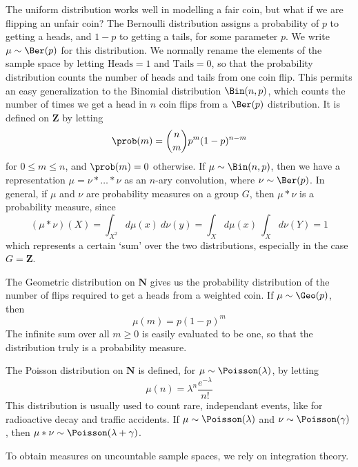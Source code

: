 \begin{example}
    The uniform distribution works well in modelling a fair coin, but what if we are flipping an unfair coin? The Bernoulli distribution assigns a probability of $p$ to getting a heads, and $1-p$ to getting a tails, for some parameter $p$. We write $\mu \sim \Ber(p)$ for this distribution. We normally rename the elements of the sample space by letting $\text{Heads} = 1$ and $\text{Tails} = 0$, so that the probability distribution counts the number of heads and tails from one coin flip. This permits an easy generalization to the Binomial distribution $\Bin(n,p)$, which counts the number of times we get a head in $n$ coin flips from a $\Ber(p)$ distribution. It is defined on $\mathbf{Z}$ by letting
    \[ \prob(m) = \binom{n}{m} p^m (1-p)^{n-m} \]
    for $0 \leq m \leq n$, and $\prob(m) = 0$ otherwise. If $\mu \sim \Bin(n,p)$, then we have a representation $\mu = \nu * \dots * \nu$ as an $n$-ary convolution, where $\nu \sim \Ber(p)$. In general, if $\mu$ and $\nu$ are probability measures on a group $G$, then $\mu * \nu$ is a probability measure, since
    \[ (\mu * \nu)(X) = \int_{X^2} d\mu(x)\ d\nu(y) = \int_X d\mu(x) \ \int_X d\nu(Y) = 1 \]
    which represents a certain `sum' over the two distributions, especially in the case $G = \mathbf{Z}$.
\end{example}

\begin{example}
    The Geometric distribution on $\mathbf{N}$ gives us the probability distribution of the number of flips required to get a heads from a weighted coin. If $\mu \sim \Geo(p)$, then
    \[ \mu(m) = p (1-p)^m \]
    The infinite sum over all $m \geq 0$ is easily evaluated to be one, so that the distribution truly is a probability measure.
\end{example}

\begin{example}
    The Poisson distribution on $\mathbf{N}$ is defined, for $\mu \sim \Poisson(\lambda)$, by letting
    \[ \mu(n) = \lambda^n \frac{e^{-\lambda}}{n!} \]
    This distribution is usually used to count rare, independant events, like for radioactive decay and traffic accidents. If $\mu \sim \Poisson(\lambda)$ and $\nu \sim \Poisson(\gamma)$, then $\mu * \nu \sim \Poisson(\lambda + \gamma)$.
\end{example}

To obtain measures on uncountable sample spaces, we rely on integration theory.

